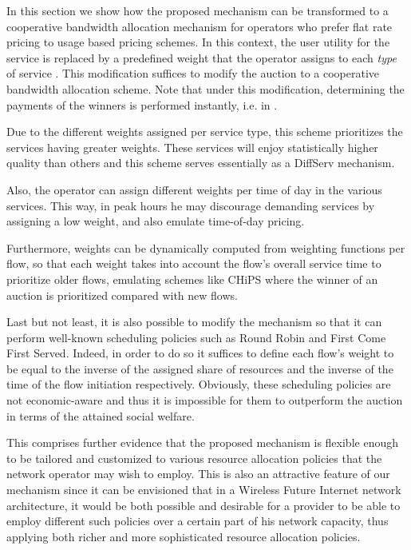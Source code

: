 \documentclass[a4paper]{article}
\begin{document}
In this section we show how the proposed mechanism can be transformed to
a cooperative bandwidth allocation mechanism for
operators who prefer flat rate pricing to usage based pricing schemes. 
In this context, the user utility for the service  is replaced
by a predefined weight  that the operator assigns to each {\em type} of
service . This modification suffices to modify the auction to a 
cooperative bandwidth allocation scheme. Note that under this
modification, determining the payments of the winners 
is performed instantly, i.e. in .

Due to the different weights assigned per service type, 
this scheme prioritizes the services having greater weights. 
These services will enjoy statistically higher quality than others
and this scheme serves essentially as a DiffServ mechanism.

Also, the operator can assign different weights per time of day
in the various services. This way, in peak hours he may discourage  
demanding services by assigning 
a low weight, and also emulate time-of-day pricing. 

Furthermore, weights can be dynamically computed from weighting functions per
flow, so that each weight takes into account the flow's
overall service time to prioritize older flows, emulating
schemes like CHiPS \cite{chips} where the winner of an auction is
prioritized compared with new flows.

Last but not least, it is also possible to modify the mechanism so that it
can perform well-known scheduling policies such as Round Robin and First
Come First Served. Indeed, in order to do so it suffices to define each flow's weight 
to be equal to the inverse of the assigned share of resources and the inverse 
of the time of the flow initiation respectively. Obviously, these scheduling
policies are not economic-aware and thus it is impossible for them to outperform
the auction in terms of the attained social welfare.

This comprises further evidence that the proposed mechanism is flexible enough to
be tailored and customized to various resource allocation policies that the 
network operator may wish to employ. This is also an attractive feature of our
mechanism since it can be envisioned that in a Wireless Future Internet network
architecture, it would be both possible and desirable for a provider to be able 
to employ different such policies over a certain part of his network capacity, thus
applying both richer and more sophisticated resource allocation policies.
\end{document}
